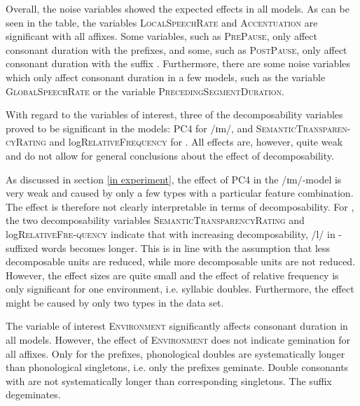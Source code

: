 Overall, the noise variables showed the expected effects in all models. As can be seen in the table, the variables \textsc{LocalSpeechRate} and \textsc{Accentuation} are significant with all affixes. 
Some variables, such as \textsc{PrePause}, only affect consonant duration with the prefixes, and some, such as \textsc{PostPause}, only affect consonant duration with the suffix .  
 Furthermore, there are some noise variables which only affect consonant duration in a few models, such as the variable \textsc{GlobalSpeechRate} or the variable \textsc{PrecedingSegmentDuration}. 

With regard to the variables of interest, three of the decomposability variables proved to be significant in the models: \textsc{PC4} for /ɪm/, and \textsc{SemanticTransparen- cyRating} and log\textsc{RelativeFrequency} for . 
 All effects are, however, quite weak and do not allow for general conclusions about the effect of decomposability. 
 
 As discussed in section \ref{in experiment}, the effect of \textsc{PC4} in the /ɪm/-model is very weak and caused by only a few types with a particular feature combination. The effect is therefore not clearly interpretable in terms of decomposability. 
 For , the two decomposability variables \textsc{SemanticTransparencyRating} and log\textsc{RelativeFre-quency} indicate that with increasing decomposability, /l/ in -suffixed words becomes longer. This is in line with the assumption that less decomposable units are reduced, while more decomposable units are not reduced. However, the effect sizes are quite small and the effect of relative frequency is only significant for one environment, i.e. syllabic doubles. 
Furthermore, the effect might be caused by only two types in the data set.


%
The variable of interest \textsc{Environment} significantly affects consonant duration in all models. 
However, the effect of \textsc{Environment} does not indicate gemination for all affixes. Only for the prefixes, phonological doubles are systematically longer than phonological singletons, i.e. only the prefixes geminate. Double consonants with  are not systematically longer than corresponding singletons. The suffix  degeminates.  


